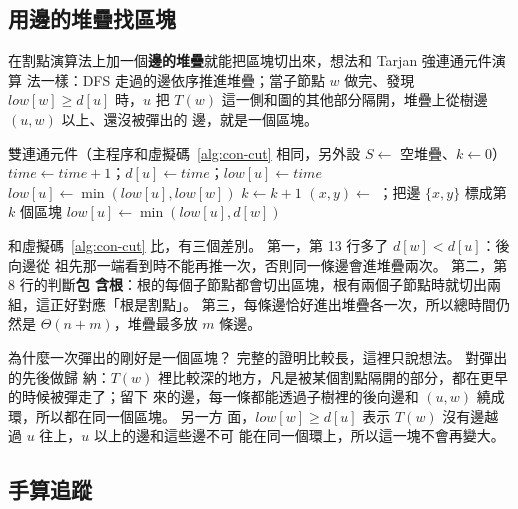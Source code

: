 \subsection{用邊的堆疊找區塊}

在割點演算法上加一個\textbf{邊的堆疊}就能把區塊切出來，想法和 Tarjan 強連通元件演算
法一樣：DFS 走過的邊依序推進堆疊；當子節點 $w$ 做完、發現 $\mathit{low}[w] \ge d[u]$
時，$u$ 把 $T(w)$ 這一側和圖的其他部分隔開，堆疊上從樹邊 $(u, w)$ 以上、還沒被彈出的
邊，就是一個區塊。

\begin{pseudo}[label=alg:con-bcc]{雙連通元件（主程序和虛擬碼~\ref{alg:con-cut} 相同，另外設 $S \gets$ 空堆疊、$k \gets 0$）}
    \State $\mathit{time} \gets \mathit{time} + 1$；$d[u] \gets \mathit{time}$；$\mathit{low}[u] \gets \mathit{time}$
         
            \State {}
            \State {}
            \State $\mathit{low}[u] \gets \min(\mathit{low}[u], \mathit{low}[w])$
                \State $k \gets k + 1$ 
                \Repeat
                    \State $(x, y) \gets$ ；把邊 $\{x, y\}$ 標成第 $k$ 個區塊
            \EndIf
         
            \State {}
            \State $\mathit{low}[u] \gets \min(\mathit{low}[u], d[w])$
        \EndIf
    \EndFor
\EndProcedure
\end{pseudo}

和虛擬碼~\ref{alg:con-cut} 比，有三個差別。 第一，第 13 行多了 $d[w] < d[u]$：後向邊從
祖先那一端看到時不能再推一次，否則同一條邊會進堆疊兩次。 第二，第 8 行的判斷\textbf{包
含根}：根的每個子節點都會切出區塊，根有兩個子節點時就切出兩組，這正好對應「根是割點」。
第三，每條邊恰好進出堆疊各一次，所以總時間仍然是 $\Theta(n + m)$，堆疊最多放 $m$ 條邊。

為什麼一次彈出的剛好是一個區塊？ 完整的證明比較長，這裡只說想法。 對彈出的先後做歸
納：$T(w)$ 裡比較深的地方，凡是被某個割點隔開的部分，都在更早的時候被彈走了；留下
來的邊，每一條都能透過子樹裡的後向邊和 $(u, w)$ 繞成環，所以都在同一個區塊。 另一方
面，$\mathit{low}[w] \ge d[u]$ 表示 $T(w)$ 沒有邊越過 $u$ 往上，$u$ 以上的邊和這些邊不可
能在同一個環上，所以這一塊不會再變大。

\subsection{手算追蹤}

